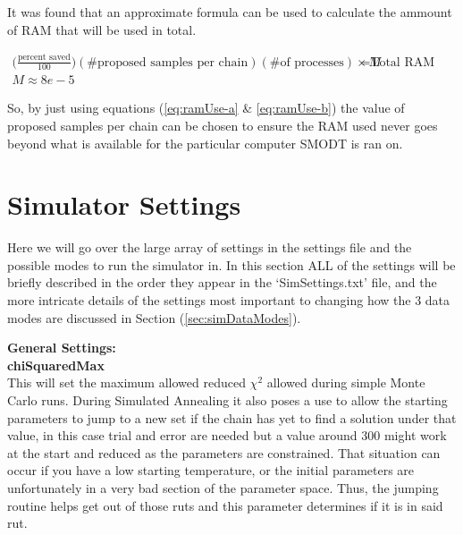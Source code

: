 \documentclass[12pt,preprint]{aastex}
\begin{document}
It was found that an approximate formula can be used to calculate the ammount of RAM that will be used in total.

\begin{subequations}
\begin{align}
\label{eq:ramUse-a}
\big(\frac{\text{percent saved}}{100}\big)(\text{\# proposed samples per chain})(\text{\# of processes})\times M& = \text{Total RAM [MB]}\\
\label{eq:ramUse-b}
M \approx 8e-5
\end{align}
\end{subequations}

So, by just using equations (\ref{eq:ramUse-a} \& \ref{eq:ramUse-b}) the value of proposed samples per chain can be chosen to ensure the RAM used never goes beyond what is available for the particular computer SMODT is ran on.

\clearpage
\section{Simulator Settings}\label{sec:simSettings}

Here we will go over the large array of settings in the settings file and the possible modes to run the simulator in.  In this section ALL of the settings will be briefly described in the order they appear in the `SimSettings.txt' file, and the more intricate details of the settings most important to changing how the 3 data modes are discussed in Section (\ref{sec:simDataModes}).






{\bf \color{blue} General Settings: }\\
{\bf chiSquaredMax}\\
This will set the maximum allowed reduced $\chi^2$ allowed during simple Monte Carlo runs.  During Simulated Annealing it also poses a use to allow the starting parameters to jump to a new set if the chain has yet to find a solution under that value, in this case trial and error are needed but a value around 300 might work at the start and reduced as the parameters are constrained.  That situation can occur if you have a low starting temperature, or the initial parameters are unfortunately in a very bad section of the parameter space.  Thus, the jumping routine helps get out of those ruts and this parameter determines if it is in said rut.
\end{document}
